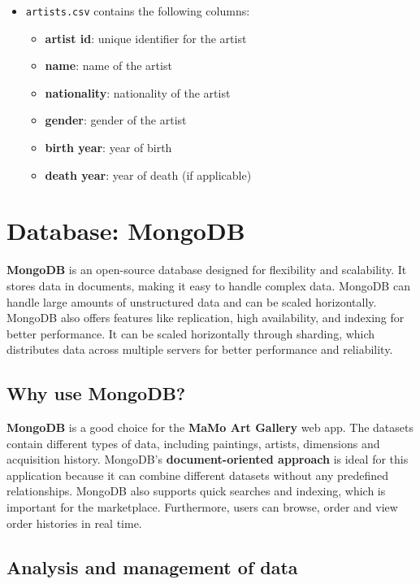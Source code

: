 \documentclass[a4paper,12pt]{article}
\begin{document}
\begin{itemize}
      \item \texttt{artists.csv} contains the following columns:
            \begin{itemize}
                  \item \textbf{artist id}: unique identifier for the artist
                  \item \textbf{name}: name of the artist
                  \item \textbf{nationality}: nationality of the artist
                  \item \textbf{gender}: gender of the artist
                  \item \textbf{birth year}: year of birth
                  \item \textbf{death year}: year of death (if applicable)
            \end{itemize}
\end{itemize}

\newpage
\section{Database: MongoDB}
\justify

\textbf{MongoDB} is an open-source database designed for flexibility and scalability. It stores data in documents, making it easy to handle complex data. MongoDB can handle large amounts of unstructured data and can be scaled horizontally. MongoDB also offers features like replication, high availability, and indexing for better performance. It can be scaled horizontally through sharding, which distributes data across multiple servers for better performance and reliability.


\subsection{Why use MongoDB?}
\justify
\textbf{MongoDB} is a good choice for the \textbf{MaMo Art Gallery} web app. The datasets contain different types of data, including paintings, artists, dimensions and acquisition history. MongoDB's \textbf{document-oriented approach} is ideal for this application because it can combine different datasets without any predefined relationships. MongoDB also supports quick searches and indexing, which is important for the marketplace. Furthermore, users can browse, order and view order histories in real time.

\subsection{Analysis and management of data}
\justify
\end{document}

